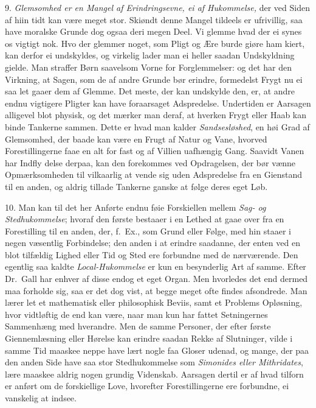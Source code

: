 \documentclass[12pt,a4paper]{article}
\newcommand{\opage}[1]{\marginnote{\footnotesize\textit{[#1]}}}
\begin{document}
9. \emph{Glemsomhed er en Mangel af Erindringsevne, ei af Hukommelse,} der ved Siden af
hiin tidt kan være meget stor. Skiøndt denne Mangel tildeels er ufrivillig, saa have
moralske Grunde dog ogsaa deri megen Deel. Vi glemme hvad der ei synes os vigtigt nok.
Hvo der glemmer noget, som Pligt og Ære burde giøre ham kiert, kan derfor ei undskyldes,
og virkelig lader man ei heller saadan Undskyldning gielde. Man straffer Børn saavelsom
Vorne for Forglemmelser: og det har den Virkning, at Sagen, som de af andre Grunde bør
erindre, formedelst Frygt nu ei saa let gaaer dem af Glemme. Det meste, der kan undskylde
den, er, at andre endnu vigtigere Pligter kan have foraarsaget Adspredelse. Undertiden er
Aarsagen alligevel blot physisk, og det mærker man deraf, at hverken Frygt eller Haab kan
binde Tankerne sammen. Dette er hvad man kalder \emph{Sandsesløshed}, en høi Grad af
Glemsomhed, der baade kan være en Frugt af Natur og Vane, hvorved Forestillingerne faae
en alt for fast og af Villien uafhængig Gang. Saavidt Vanen har Indfly%
\opage{112}delse derpaa, kan den forekommes ved Opdragelsen, der bør vænne Opmærksomheden til
vilkaarlig at vende sig uden Adspredelse fra en Gienstand til en anden, og aldrig tillade
Tankerne ganske at følge deres eget Løb.

10. Man kan til det her Anførte endnu føie Forskiellen mellem \emph{Sag- og
Stedhukommelse}; hvoraf den første bestaaer i en Lethed at gaae over fra en Forestilling
til en anden, der, f.~Ex., som Grund eller Følge, med hin staaer i negen væsentlig
Forbindelse; den anden i at erindre saadanne, der enten ved en blot tilfældig Lighed
eller Tid og Sted ere forbundne med de nærværende. Den egentlig saa kaldte
\emph{Local-Hukommelse} er kun en besynderlig Art af samme. Efter Dr.\ Gall har enhver af
disse endog et eget Organ. Men hvorledes det end dermed maa forholde sig, saa er det dog
vist, at begge meget ofte findes afsondrede. Man lærer let et mathematisk eller
philosophisk Beviis, samt et Problems Opløsning, hvor vidtløftig de end kan være, naar
man kun har fattet Setningernes Sammenhæng med hverandre. Men de samme Personer, der
efter første Giennemlæsning eller Hørelse kan erindre saadan Rekke af Slutninger, vilde i
samme Tid maaskee neppe have lært nogle faa Gloser udenad, og mange, der paa den anden
Side have saa stor Stedhukommelse som \emph{Simonides eller Mithridates}, lære maaskee
aldrig nogen grundig Videnskab. Aarsagen dertil er af hvad tilforn er anført om de
forskiellige Love,
\opage{113} hvorefter Forestillingerne ere forbundne, ei vanskelig at indsee.
\end{document}
